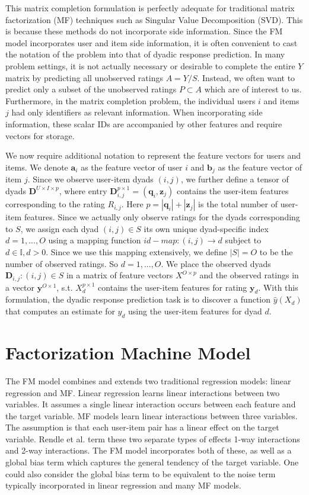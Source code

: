 \documentclass[10pt]{journal}
\begin{document}
This matrix completion formulation is perfectly adequate for traditional matrix
factorization (MF) techniques such as Singular Value Decomposition (SVD). This is
because these methods do not incorporate side information. Since the FM model
incorporates user and item side information, it is often convenient to cast the
notation of the problem into that of dyadic response prediction. In many problem
settings, it is not actually necessary or desirable to complete the entire $Y$
matrix by predicting all unobserved ratings $A = Y / S$. Instead, we often want
to predict only a subset of the unobserved ratings $P \subset A$ which are of
interest to us. Furthermore, in the matrix completion problem, the individual
users $i$ and items $j$ had only identifiers as relevant information. When
incorporating side information, these scalar IDs are accompanied by other
features and require vectors for storage.

We now require additional notation to represent the feature vectors for users
and items. We denote $\bm{a}_i$ as the feature vector of user $i$ and $\bm{b}_j$
as the feature vector of item $j$. Since we observe user-item dyads $(i, j)$, we
further define a tensor of dyads $\bm{D}^{U \times I \times p}$, where entry
$\bm{D}_{i, j}^{p \times 1} = (\bm{q}_i, \bm{z}_j)$ contains the user-item
features corresponding to the rating $R_{i, j}$. Here $p = |\bm{q}_i| +
|\bm{z}_j|$ is the total number of user-item features. Since we actually only
observe ratings for the dyads corresponding to $S$, we assign each dyad $(i, j)
\in S$ its own unique dyad-specific index $d = {1, ..., O}$ using a mapping
function $id-map: (i, j) \rightarrow d$ subject to $d \in \mathbb{I}, d > 0$.
Since we use this mapping extensively, we define $|S| = O$ to be the number of
observed ratings. So $d = {1, ..., O}$. We place the observed dyads $\bm{D}_{i,
j}: (i, j) \in S$ in a matrix of feature vectors $X^{O \times p}$ and the
observed ratings in a vector $\bm{y}^{O \times 1}$, s.t. $X_d^{p \times 1}$
contains the user-item features for rating $\bm{y}_d$. With this formulation,
the dyadic response prediction task is to discover a function $\hat{y}(X_d)$
that computes an estimate for $y_d$ using the user-item features for dyad $d$.


\section{Factorization Machine Model}

The FM model combines and extends two traditional regression models: linear
regression and MF. Linear regression learns linear interactions between two
variables. It assumes a single linear interaction occurs between each feature
and the target variable. MF models learn linear interactions between three
variables. The assumption is that each user-item pair has a linear effect on the
target variable. Rendle et al. term these two separate types of effects 1-way
interactions and 2-way interactions. The FM model incorporates both of these, as
well as a global bias term which captures the general tendency of the target
variable. One could also consider the global bias term to be equivalent to the
noise term typically incorporated in linear regression and many MF models.
\end{document}
